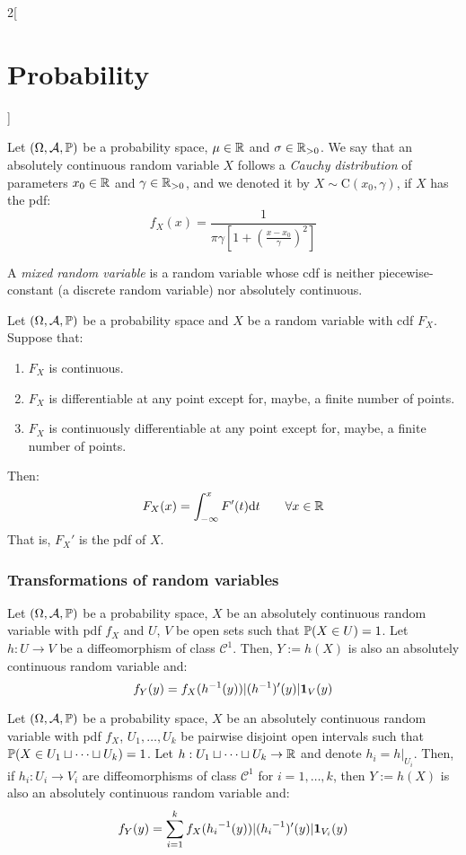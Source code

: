 \documentclass[../../../main.tex]{subfiles}
\begin{document}
\begin{multicols}{2}[\section{Probability}]
\begin{definition}
  \end{definition}
  \begin{definition}
    Let $(\Omega,\mathcal{A},\mathbb{P})$ be a probability space, $\mu\in\mathbb{R}$ and $\sigma\in\mathbb{R}_{>0}$. We say that an absolutely continuous random variable $X$ follows a \textit{Cauchy distribution} of parameters $x_0\in\mathbb{R}$ and $\gamma\in\mathbb{R}_{>0}$, and we denoted it by $X\sim \text{C}(x_0,\gamma)$, if $X$ has the pdf: $$f_X(x)=\frac{1}{\pi\gamma\left[1+{\left(\frac{x-x_0}{\gamma}\right)}^2\right]}$$
  \end{definition}
  \begin{definition}
    A \textit{mixed random variable} is a random variable whose cdf is neither piecewise-constant (a discrete random variable) nor absolutely  continuous.
  \end{definition}
  \begin{theorem}
    Let $(\Omega,\mathcal{A},\mathbb{P})$ be a probability space and $X$ be a random variable with cdf $F_X$. Suppose that:
    \begin{enumerate}
      \item $F_X$ is continuous.
      \item $F_X$ is differentiable at any point except for, maybe, a finite number of points.
      \item $F_X$ is continuously differentiable at any point except for, maybe, a finite number of points.
    \end{enumerate}
    Then: $$F_X(x)=\int_{-\infty}^xF'(t)\dd t\qquad\forall x\in\mathbb{R}$$
    That is, ${F_X}'$ is the pdf of $X$.
  \end{theorem}
  \subsubsection{Transformations of random variables}
  \begin{prop}
    Let $(\Omega,\mathcal{A},\mathbb{P})$ be a probability space, $X$ be an absolutely continuous random variable with pdf $f_X$ and $U$, $V$ be open sets such that $\mathbb{P}(X\in U)=1$. Let $h:U\rightarrow V$ be a diffeomorphism of class $\mathcal{C}^1$. Then, $Y:=h(X)$ is also an absolutely continuous random variable and: $$f_Y(y)=f_X(h^{-1}(y))|(h^{-1})'(y)|\boldsymbol{\mathrm{1}}_V(y)$$
  \end{prop}
  \begin{prop}
    Let $(\Omega,\mathcal{A},\mathbb{P})$ be a probability space, $X$ be an absolutely continuous random variable with pdf $f_X$, $U_1,\ldots, U_k$ be pairwise disjoint open intervals such that $\mathbb{P}(X\in U_1\sqcup \cdots\sqcup U_k)=1$. Let $h:U_1\sqcup \cdots\sqcup U_k\rightarrow \mathbb{R}$ and denote $h_i=h|_{U_i}$. Then, if $h_i:U_i\rightarrow V_i$ are  diffeomorphisms of class $\mathcal{C}^1$ for $i=1,\ldots,k$, then $Y:=h(X)$ is also an absolutely continuous random variable and: $$f_Y(y)=\sum_{i=1}^kf_X({h_i}^{-1}(y))|({h_i}^{-1})'(y)|\boldsymbol{\mathrm{1}}_{V_i}(y)$$
  \end{prop}

\end{multicols}
\end{document}
